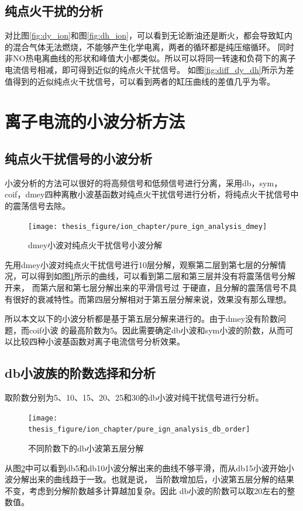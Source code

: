 \subsection{纯点火干扰的分析}
对比图\ref{fig:dy_ion}和图\ref{fig:dh_ion}，可以看到无论断油还是断火，都会导致缸内的混合气体无法燃烧，不能够产生化学电离，两者的循环都是纯压缩循环。
同时非NO热电离曲线的形状和峰值大小都类似。所以可以将同一转速和负荷下的离子电流信号相减，即可得到近似的纯点火干扰信号。
如图\ref{fig:diff_dy_dh}所示为差值得到的近似纯点火干扰信号，可以看到两者的缸压曲线的差值几乎为零。
\section{离子电流的小波分析方法}
\subsection{纯点火干扰信号的小波分析} 
小波分析的方法可以很好的将高频信号和低频信号进行分离，采用db，sym，coif，dmey四种离散小波基函数对纯点火干扰信号进行分析，将纯点火干扰信号中的震荡信号去除。
\begin{figure}[htb]
	\centering
	\texttt{[image: thesis\_figure/ion\_chapter/pure\_ign\_analysis\_dmey]}
	\caption{\label{fig:pure_ign_analysis_dmey}dmey小波对纯点火干扰信号小波分解}
\end{figure}
先用dmey小波对纯点火干扰信号进行10层分解，观察第二层到第七层的分解情况，可以得到如图\ref{fig:pure_ign_analysis_dmey}所示的曲线，可以看到第二层和第三层并没有将震荡信号分解开来，
而第六层和第七层分解出来的平滑信号过
于硬直，且分解的震荡信号不具有很好的衰减特性。而第四层分解相对于第五层分解来说，效果没有那么理想。\par
所以本文以下的小波分析都是基于第五层分解来进行的。由于dmey没有阶数问题，而coif小波
的最高阶数为5。因此需要确定db小波和sym小波的阶数，从而可以比较四种小波基函数对离子电流信号分析效果。
\subsection{db小波族的阶数选择和分析} 
取阶数分别为5、10、15、20、25和30的db小波对纯干扰信号进行分析。
\begin{figure}[htb]
	\centering
	\texttt{[image: thesis\_figure/ion\_chapter/pure\_ign\_analysis\_db\_order]}
	\caption{\label{fig:dbvar}不同阶数下的db小波第五层分解}
\end{figure}
从图\ref{fig:dbvar}中可以看到db5和db10小波分解出来的曲线不够平滑，而从db15小波开始小波分解出来的曲线趋于一致。也就是说，
当阶数增加后，小波第五层分解的结果不变，考虑到分解阶数越多计算越加复杂。因此
db小波的阶数可以取20左右的整数值。
